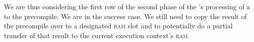 \begin{center}
\end{center}
We are thus considering the first row of the second phase of the \hubMod{}'s processing of a  to the  precompile.
We are in the success case.
We still need to copy the result of the precompile over to a designated \textsc{ram} slot and to potentially do a partial transfer of that result to the current execution context's \textsc{ram}.
